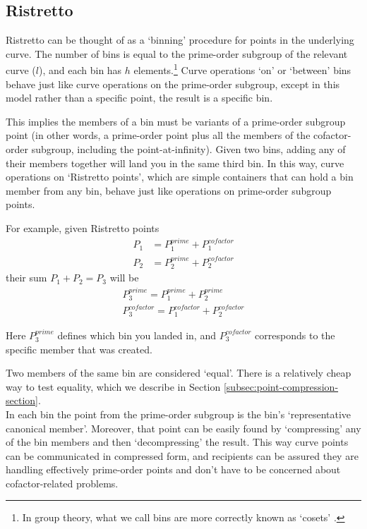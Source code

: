\subsection{Ristretto}
\label{subsec:ristretto}

Ristretto can be thought of as a `binning' procedure for points in the underlying curve. The number of bins is equal to the prime-order subgroup of the relevant curve ($l$), and each bin has $h$ elements.\footnote{In group theory, what we call bins are more correctly known as `cosets' \cite{coset-wikibooks}.} Curve operations `on' or `between' bins behave just like curve operations on the prime-order subgroup, except in this model rather than a specific point, the result is a specific bin.

This implies the members of a bin must be variants of a prime-order subgroup point (in other words, a prime-order point plus all the members of the cofactor-order subgroup, including the point-at-infinity). Given two bins, adding any of their members together will land you in the same third bin. In this way, curve operations on `Ristretto points', which are simple containers that can hold a bin member from any bin, behave just like operations on prime-order subgroup points.

For example, given Ristretto points
\begin{align*}
    P_1 &= P^{prime}_1 + P^{cofactor}_1 \\
    P_2 &= P^{prime}_2 + P^{cofactor}_2
\end{align*}
their sum $P_1 + P_2 = P_3$ will be
\begin{align*}
    P^{prime}_3 = P^{prime}_1 + P^{prime}_2 \\
    P^{cofactor}_3 = P^{cofactor}_1 + P^{cofactor}_2
\end{align*}

Here $P^{prime}_3$ defines which bin you landed in, and $P^{cofactor}_3$ corresponds to the specific member that was created.

Two members of the same bin are considered `equal'. There is a relatively cheap way to test equality, which we describe in Section \ref{subsec:point-compression-section}.\\

In each bin the point from the prime-order subgroup is the bin's `representative canonical member'. Moreover, that point can be easily found by `compressing' any of the bin members and then `decompressing' the result. This way curve points can be communicated in compressed form, and recipients can be assured they are handling effectively prime-order points and don't have to be concerned about cofactor-related problems.

